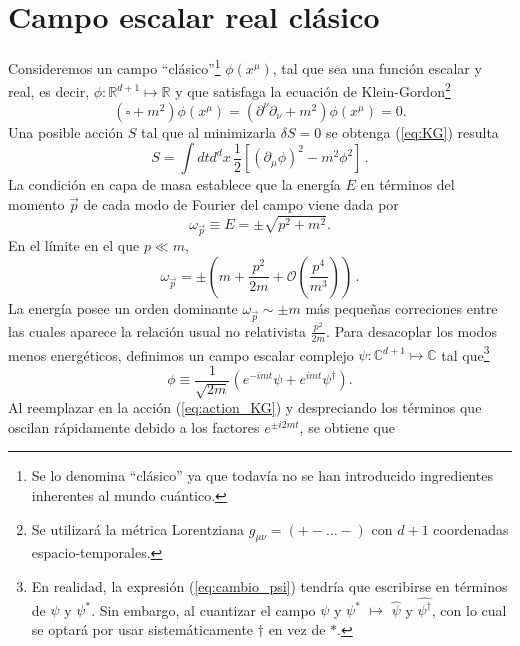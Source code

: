 \section{Campo escalar real clásico}
Consideremos un campo “clásico”\footnote{Se lo denomina “clásico” ya que todavía no se han introducido ingredientes inherentes al mundo cuántico.} $\phi(x^{\mu})$, tal que sea una función escalar y real, es decir, $\phi: \mathbb{R}^{d+1}\mapsto \mathbb{R}$ y que satisfaga la ecuación de Klein-Gordon\footnote{Se utilizará la métrica Lorentziana $g_{\mu \nu}=(+-\ldots -)$ con $d+1$ coordenadas espacio-temporales.}
\begin{equation}
(\square+m^2)\phi(x^{\mu})=(\partial^{\nu}\partial_{\nu}+m^2)\phi(x^{\mu})=0.
\label{eq:KG}
\end{equation}
Una posible acción $S$ tal que al minimizarla $\delta S=0$ se obtenga (\ref{eq:KG}) resulta
\begin{equation}
S = \int dt d^d x\, \frac{1}{2} \left[ (\partial_\mu \phi)^2 - m^2 \phi^2\right]\,.
\label{eq:action_KG}
\end{equation}
La condición en capa de masa establece que la energía $E$ en términos del momento $\vec{p}$ de cada modo de Fourier del campo viene dada por
\begin{equation}
\omega_{\vec{p}}\equiv E=\pm \sqrt{p^2+m^2}.
\end{equation}
En el límite en el que $p \ll m$,
\begin{equation}
\omega _{\vec{p}}= \pm \left(m + \frac{p^2}{2m}+ \mathcal{O}\left(\frac{p^4}{m^3}\right)\right)\,.
\end{equation}
La energía posee un orden dominante $\omega_{\vec{p}}\sim \pm m$ más pequeñas correciones entre las cuales aparece la relación usual no relativista $\frac{p^2}{2m}$. Para desacoplar los modos menos energéticos, definimos un campo escalar complejo $\psi:\mathbb{C}^{d+1}\mapsto \mathbb{C}$ tal que\footnote{En realidad, la expresión (\ref{eq:cambio_psi}) tendría que escribirse en términos de $\psi$ y $\psi^{*}$. Sin embargo, al cuantizar el campo $\psi$ y $\psi^{*}$ $\mapsto$ $\hat{\psi}$ y $\hat{\psi^{\dag}}$, con lo cual se optará por usar sistemáticamente $\dag$ en vez de $*$.} 
\begin{equation}
\phi \equiv \frac{1}{\sqrt{2m}} \left(e^{-imt} \psi + e^{i m t} \psi^\dag \right).
\label{eq:cambio_psi}
\end{equation}
Al reemplazar en la acción (\ref{eq:action_KG}) y despreciando los términos que oscilan rápidamente debido a los factores $e^{\pm i2mt}$, se obtiene que
